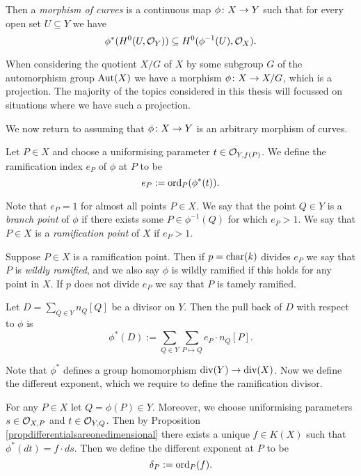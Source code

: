 Then a \emph{morphism of curves} is a continuous map $\phi \colon X \rightarrow Y$ such that for every open set $U \subseteq Y$ we have
    \[
    \phi^*(H^0(U,{\cal O}_Y)) \subseteq H^0(\phi^{-1}(U),{\cal O}_X).
    \]

When considering the quotient $X/G$ of $X$ by some subgroup $G$ of the automorphism group $\operatorname{Aut}(X)$ we have a morphism $\phi \colon X \rightarrow X/G$, which is a projection.
The majority of the topics considered in this thesis will focussed on situations where we have such a projection.

We now return to assuming that $\phi \colon X \rightarrow Y$ is an arbitrary morphism of curves.
    \begin{defn}
    Let $P \in X$ and choose a uniformising parameter $t \in {\cal O}_{Y,f(P)}$.
    We define the ramification index $e_P$ of $\phi$ at $P$ to be
        \[
        e_P := \operatorname{ord}_P(\phi^*(t)).
        \]
    \end{defn}

Note that $e_P =1$ for almost all points $P \in X$.
We say that the point $Q \in Y$ is a \emph{branch point} of $\phi$ if there exists some $P \in \phi^{-1}(Q)$ for which $e_P >1$.
We say that $P \in X$ is a \emph{ramification point} of $X$ if $e_P >1$.

    
Suppose $P \in X$ is a ramification point.
Then if $p = \operatorname{char}(k)$ divides $e_P$ we say that $P$ is \emph{wildly ramified}, and we also say $\phi$ is wildly ramified if this holds for any point in $X$.
If $p$ does not divide $e_P$ we say that $P$ is tamely ramified.

    \begin{defn}
    Let $D = \sum_{Q \in Y}n_Q [Q]$ be a divisor on $Y$.
    Then the pull back of $D$ with respect to $\phi$ is
        \[
        \phi^*(D) := \sum_{Q \in Y} \sum_{P \mapsto Q} e_P \cdot n_Q [P].
        \]
    \end{defn}

Note that $\phi^*$ defines a group homomorphism $\operatorname{div}(Y) \rightarrow \operatorname{div}(X)$.
Now we define the different exponent, which we require to define the ramification divisor.
    
    \begin{defn}\label{definitiondifferent}
    For any $P\in X$ let $Q = \phi(P) \in Y$.
    Moreover, we choose uniformising parameters $s \in {\cal O}_{X,P}$ and $t \in {\cal O}_{Y,Q}$.
    Then by Proposition \ref{propdifferentialsareonedimensional} there exists a unique $f \in K(X)$ such that $\phi^*(dt) = f\cdot ds$.
    Then we define the different exponent at $P$ to be 
        \[
        \delta_P : = \operatorname{ord}_P(f).
        \]
    \end{defn}

